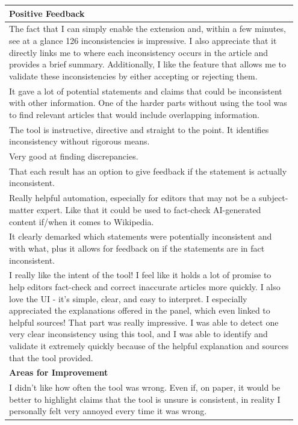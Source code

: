 \documentclass[11pt]{article}
\begin{document}
\begin{table}[htbp]
\centering
\begin{tabular}{p{0.95\linewidth}}
\toprule
\textbf{Positive Feedback} \\
\midrule
The fact that I can simply enable the extension and, within a few minutes, see at a glance 126 inconsistencies is impressive. I also appreciate that it directly links me to where each inconsistency occurs in the article and provides a brief summary. Additionally, I like the feature that allows me to validate these inconsistencies by either accepting or rejecting them. \\
\midrule
It gave a lot of potential statements and claims that could be inconsistent with other information. One of the harder parts without using the tool was to find relevant articles that would include overlapping information. \\
\midrule
The tool is instructive, directive and straight to the point. It identifies inconsistency without rigorous means. \\
\midrule
Very good at finding discrepancies. \\
\midrule
That each result has an option to give feedback if the statement is actually inconsistent. \\
\midrule
Really helpful automation, especially for editors that may not be a subject-matter expert. Like that it could be used to fact-check AI-generated content if/when it comes to Wikipedia. \\
\midrule
It clearly demarked which statements were potentially inconsistent and with what, plus it allows for feedback on if the statements are in fact inconsistent. \\
\midrule
I really like the intent of the tool! I feel like it holds a lot of promise to help editors fact-check and correct inaccurate articles more quickly. I also love the UI - it's simple, clear, and easy to interpret. I especially appreciated the explanations offered in the panel, which even linked to helpful sources! That part was really impressive. I was able to detect one very clear inconsistency using this tool, and I was able to identify and validate it extremely quickly because of the helpful explanation and sources that the tool provided. \\
\midrule
\textbf{Areas for Improvement} \\
\midrule
I didn't like how often the tool was wrong. Even if, on paper, it would be better to highlight claims that the tool is unsure is consistent, in reality I personally felt very annoyed every time it was wrong. \\

\end{tabular}
\end{table}
\end{document}
